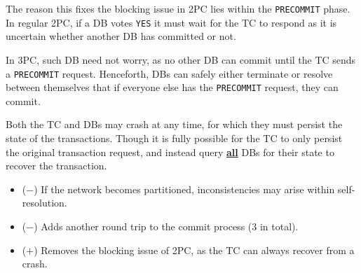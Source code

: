 \begin{theo}

    The reason this fixes the blocking issue in 2PC lies within the \texttt{PRECOMMIT} phase.
    In regular 2PC, if a DB votes \texttt{YES} it must wait for the TC to respond as it is uncertain whether another DB 
    has committed or not.

    In 3PC, such DB need not worry, as no other DB can commit until the TC sends a \texttt{PRECOMMIT} request. Henceforth,
    DBs can safely either terminate or resolve between themselves that if everyone else has the \texttt{PRECOMMIT} request, they can commit.
\end{theo}

\begin{theo}

    Both the TC and DBs may crash at any time, for which they must persist the state of the transactions.
    Though it is fully possible for the TC to only persist the original transaction request, and instead 
    query \underline{\textbf{all}} DBs for their state to recover the transaction. 
\end{theo}    

\begin{theo}[3PC Tradeoffs]

    \begin{itemize}
        \item ($-$) If the network becomes partitioned, inconsistencies may arise within self-resolution.
        \item ($-$) Adds another round trip to the commit process (3 in total).
        \item ($+$) Removes the blocking issue of 2PC, as the TC can always recover from a crash. 
    \end{itemize}
\end{theo}


\newpage 

